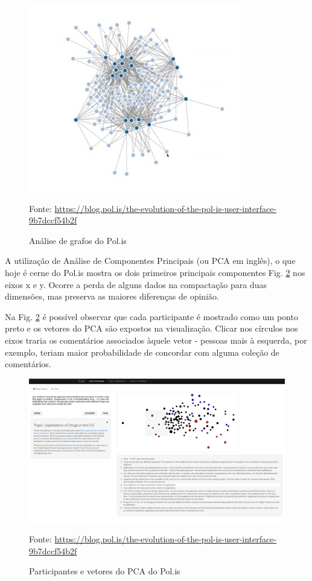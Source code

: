 \begin{figure}[h]
	\centering
	\includegraphics[keepaspectratio=true,scale=0.4]{figuras/evolucao-polis-1.png}
	\caption{Análise de grafos do Pol.is}
	Fonte: \url{https://blog.pol.is/the-evolution-of-the-pol-is-user-interface-9b7dccf54b2f}
	\label{fig01}
\end{figure}

A utilização de Análise de Componentes Principais (ou PCA em inglês), o que hoje é cerne do Pol.is mostra os dois primeiros principais componentes Fig. \ref{fig02} nos eixos x e y. Ocorre a perda de alguns dados na compactação para duas dimensões, mas preserva as maiores diferenças de opinião. 

Na Fig. \ref{fig02} é possível observar que cada participante é mostrado como um ponto preto e os vetores do PCA são expostos na visualização. Clicar nos círculos nos eixos traria os comentários associados àquele vetor - pessoas mais à esquerda, por exemplo, teriam maior probabilidade de concordar com alguma coleção de comentários.


\begin{figure}[h]
	\centering
	\includegraphics[keepaspectratio=true,scale=0.2]{figuras/evolucao-polis-2.png}
	\caption{Participantes e vetores do PCA do Pol.is}
	Fonte: \url{https://blog.pol.is/the-evolution-of-the-pol-is-user-interface-9b7dccf54b2f}
	\label{fig02}
\end{figure}



